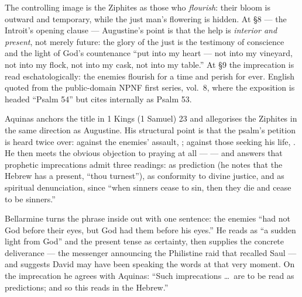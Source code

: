 \begin{witnessnote}
The controlling image is the Ziphites as those who \textit{flourish}: their
bloom is outward and temporary, while the just man's flowering is hidden. At
§8 --- the Introit's opening clause --- Augustine's point is that the help is
\textit{interior and present}, not merely future: the glory of the just is the
testimony of conscience and the light of God's countenance ``put into my
heart --- not into my vineyard, not into my flock, not into my cask, not into
my table.'' At §9 the imprecation is read eschatologically: the enemies
flourish for a time and perish for ever. English quoted from the
public-domain NPNF first series, vol.~8, where the exposition is headed
``Psalm 54'' but cites internally as Psalm 53.
\end{witnessnote}

\begin{witnessnote}
Aquinas anchors the title in 1 Kings (1 Samuel) 23 and allegorises the
Ziphites in the same direction as Augustine. His structural point is that the
psalm's petition is heard twice over: against the enemies' assault,
; against those seeking his life, . He then meets the obvious objection to praying
 at all ---  --- and
answers that prophetic imprecations admit three readings: as prediction (he
notes that the Hebrew has a present, ``thou turnest''), as conformity to
divine justice, and as spiritual denunciation, since ``when sinners cease to
sin, then they die and cease to be sinners.''
\end{witnessnote}

\begin{witnessnote}
Bellarmine turns the phrase inside out with one sentence: the enemies ``had
not God before their eyes, but God had them before his eyes.'' He reads
 as ``a sudden light from God'' and the present tense as
certainty, then supplies the concrete deliverance --- the messenger announcing
the Philistine raid that recalled Saul --- and suggests David may have been
speaking the words at that very moment. On the imprecation he agrees with
Aquinas: ``Such imprecations \dots\ are to be read as predictions; and so this
reads in the Hebrew.''
\end{witnessnote}

